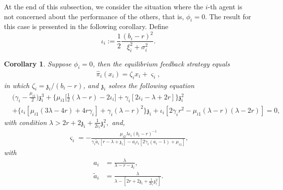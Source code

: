 \documentclass[11pt]{article}
\newtheorem{corollary}{Corollary}[section]
\numberwithin{equation}{section}
\begin{document}
	At the end of this subsection, we consider the situation where the \(i\)-th agent is not concerned about the performance of the others, that is, \(\phi_i = 0\). The result for this case is presented in the following corollary. Define
\[\iota_i:=\frac{1}{2}\frac{(b_i-r)^2}{\xi_i^2+\sigma_i^2}.\]
	\begin{corollary}\label{cor:phi0}
		Suppose \(\phi_i = 0\), then the equilibrium  feedback  strategy equals
		\begin{align}\label{eq:phi0}
			\widehat{\pi}_i(x_i)=\zeta_ix_i + \varsigma_i,
		\end{align}
		in which \(\zeta_i=\mathfrak{z}_i/(b_i-r)\), and \(\mathfrak{z}_i\) solves the following equation
		\begin{align}
			&\bigg(\gamma_i-\frac{\mu_{i1}}{2}\bigg)\mathfrak{z}_i^3+\bigg\{\mu_{i1}\bigg[\frac{1}{2} (\lambda-r)-2\iota_i\bigg]+\gamma_i[2\iota_i-\lambda+2r]\bigg\}\mathfrak{z}_i^2 \\
			&+\{\iota_i[\mu_{i1}(3\lambda-4r)+4r\gamma_i]+\gamma_i(\lambda-r)^2\}\mathfrak{z}_i+\iota_i[2\gamma_i r^2-\mu_{i1}(\lambda-r)(\lambda-2r)]=0, \label{eq:pphi0}
		\end{align}
		with condition
		$\lambda>2r+2\mathfrak{z}_i+\frac{1}{2\iota_i}\mathfrak{z}_i^2,$
		and,
		\begin{align}\label{eq:varsigmai}
			\varsigma_i=-\frac{\mu_{i2}\lambda\iota_i(b_i-r)^{-1}}{\gamma_i \tilde{a}_i[r-\lambda+\mathfrak{z}_i]-a_i\iota_i[2\gamma_i(a_i-1)+\mu_{i1}]},
		\end{align}
		with
		\begin{align}
			a_i&=\frac{\lambda}{\lambda-r-\mathfrak{z}_i},\\
			 \tilde{a}_i&=\frac{\lambda}{\lambda-[2r+2\mathfrak{z}_i+\frac{1}{2\iota_i}\mathfrak{z}_i^2]}.
		\end{align}
		
		

\end{corollary}
\end{document}
